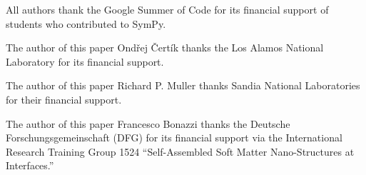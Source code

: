 All authors thank the Google Summer of Code for its financial support of
students who contributed to SymPy.

The author of this paper Ondřej Čertík thanks the Los Alamos National
Laboratory for its financial support.

The author of this paper Richard P. Muller thanks Sandia National Laboratories
for their financial support.

The author of this paper Francesco Bonazzi thanks the Deutsche
Forschungsgemeinschaft (DFG) for its financial support via the International
Research Training Group 1524 ``Self-Assembled Soft Matter Nano-Structures at
Interfaces.''
